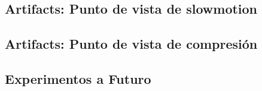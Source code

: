 \newpage
\subsection{Artifacts: Punto de vista de slowmotion}

\subsection{Artifacts: Punto de vista de compresión}


\newpage
\subsection*{Experimentos a Futuro}
